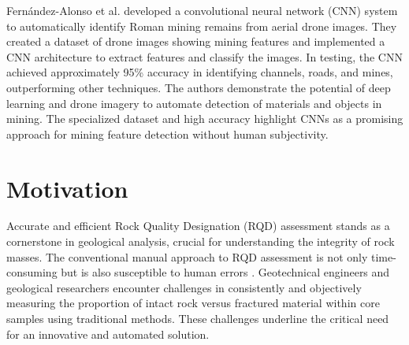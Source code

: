 \documentclass[sigconf,authordraft]{acmart}
\begin{document}
Fernández-Alonso et al.\cite{32} developed a convolutional neural network (CNN) system to automatically identify Roman mining remains from aerial drone images. They created a dataset of drone images showing mining features and implemented a CNN architecture to extract features and classify the images. In testing, the CNN achieved approximately 95\% accuracy in identifying channels, roads, and mines, outperforming other techniques. The authors demonstrate the potential of deep learning and drone imagery to automate detection of materials and objects in mining. The specialized dataset and high accuracy highlight CNNs as a promising approach for mining feature detection without human subjectivity. \\


\section{Motivation}
Accurate and efficient Rock Quality Designation (RQD) assessment stands as a cornerstone in geological analysis, crucial for understanding the integrity of rock masses. The conventional manual approach to RQD assessment is not only time-consuming but is also susceptible to human errors \cite{2, 7, 19, 22}. Geotechnical engineers and geological researchers encounter challenges in consistently and objectively measuring the proportion of intact rock versus fractured material within core samples using traditional methods. These challenges underline the critical need for an innovative and automated solution.
\end{document}
